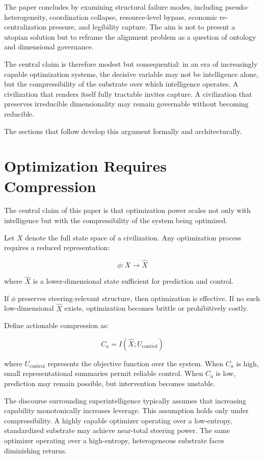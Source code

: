 \documentclass[12pt]{article}
\begin{document}
The paper concludes by examining structural failure modes, including pseudo-heterogeneity, coordination collapse, resource-level bypass, economic re-centralization pressure, and legibility capture. The aim is not to present a utopian solution but to reframe the alignment problem as a question of ontology and dimensional governance.

The central claim is therefore modest but consequential: in an era of increasingly capable optimization systems, the decisive variable may not be intelligence alone, but the compressibility of the substrate over which intelligence operates. A civilization that renders itself fully tractable invites capture. A civilization that preserves irreducible dimensionality may remain governable without becoming reducible.

The sections that follow develop this argument formally and architecturally.

\section{Optimization Requires Compression}

The central claim of this paper is that optimization power scales not only with intelligence but with the compressibility of the system being optimized.

Let $X$ denote the full state space of a civilization. Any optimization process requires a reduced representation:

\[
\phi : X \rightarrow \hat{X}
\]

where $\hat{X}$ is a lower-dimensional state sufficient for prediction and control.

If $\phi$ preserves steering-relevant structure, then optimization is effective. If no such low-dimensional $\hat{X}$ exists, optimization becomes brittle or prohibitively costly.

Define actionable compression as:

\[
C_a = I(\hat{X}; U_{\text{control}})
\]

where $U_{\text{control}}$ represents the objective function over the system. When $C_a$ is high, small representational summaries permit reliable control. When $C_a$ is low, prediction may remain possible, but intervention becomes unstable.

The discourse surrounding superintelligence typically assumes that increasing capability monotonically increases leverage. This assumption holds only under compressibility. A highly capable optimizer operating over a low-entropy, standardized substrate may achieve near-total steering power. The same optimizer operating over a high-entropy, heterogeneous substrate faces diminishing returns.
\end{document}

